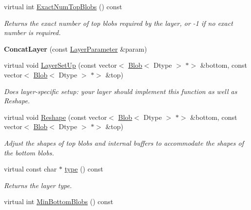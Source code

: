 \begin{DoxyCompactItemize}
virtual int \mbox{\hyperlink{classcaffe_1_1_concat_layer_a0f19a4cac8676927f9c83010957a2921}{Exact\+Num\+Top\+Blobs}} () const
\begin{DoxyCompactList}\small\item\em Returns the exact number of top blobs required by the layer, or -\/1 if no exact number is required. \end{DoxyCompactList}\item 
\mbox{\label{classcaffe_1_1_concat_layer_aa06930bae7ed23c88546f35323e1792d}} 
{\bfseries Concat\+Layer} (const \mbox{\hyperlink{classcaffe_1_1_layer_parameter}{Layer\+Parameter}} \&param)
\item 
virtual void \mbox{\hyperlink{classcaffe_1_1_concat_layer_aa39bdc6829d06c8cc501554ecd166513}{Layer\+Set\+Up}} (const vector$<$ \mbox{\hyperlink{classcaffe_1_1_blob}{Blob}}$<$ Dtype $>$ $\ast$$>$ \&bottom, const vector$<$ \mbox{\hyperlink{classcaffe_1_1_blob}{Blob}}$<$ Dtype $>$ $\ast$$>$ \&top)
\begin{DoxyCompactList}\small\item\em Does layer-\/specific setup\+: your layer should implement this function as well as Reshape. \end{DoxyCompactList}\item 
virtual void \mbox{\hyperlink{classcaffe_1_1_concat_layer_af210770b1c8bbce8fc34340ba94f9f75}{Reshape}} (const vector$<$ \mbox{\hyperlink{classcaffe_1_1_blob}{Blob}}$<$ Dtype $>$ $\ast$$>$ \&bottom, const vector$<$ \mbox{\hyperlink{classcaffe_1_1_blob}{Blob}}$<$ Dtype $>$ $\ast$$>$ \&top)
\begin{DoxyCompactList}\small\item\em Adjust the shapes of top blobs and internal buffers to accommodate the shapes of the bottom blobs. \end{DoxyCompactList}\item 
\mbox{\label{classcaffe_1_1_concat_layer_a3e7f83937180cbf11c60146b44b1a044}} 
virtual const char $\ast$ \mbox{\hyperlink{classcaffe_1_1_concat_layer_a3e7f83937180cbf11c60146b44b1a044}{type}} () const
\begin{DoxyCompactList}\small\item\em Returns the layer type. \end{DoxyCompactList}\item 
virtual int \mbox{\hyperlink{classcaffe_1_1_concat_layer_a314de9eb00a296ffd3cf84120bd1601e}{Min\+Bottom\+Blobs}} () const

\end{DoxyCompactItemize}
